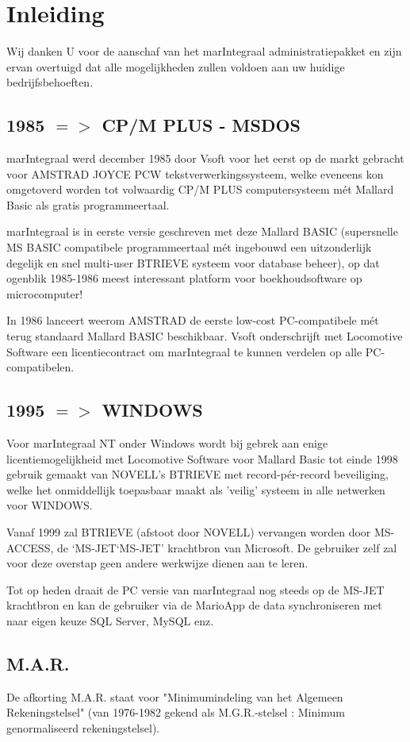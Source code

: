 \documentclass[12pt]{report} %
\begin{document}
\tableofcontents

\chapter{Inleiding}
Wij danken U voor de aanschaf van het marIntegraal administratiepakket en zijn ervan
overtuigd dat alle mogelijkheden zullen voldoen aan uw huidige bedrijfsbehoeften.

\section{1985 $=>$ CP/M PLUS - MSDOS}
marIntegraal werd december 1985 door Vsoft voor het eerst op de markt gebracht voor
AMSTRAD JOYCE PCW tekstverwerkingssysteem, welke eveneens kon omgetoverd worden tot
volwaardig CP/M PLUS computersysteem mét Mallard Basic als gratis programmeertaal.

marIntegraal is in eerste versie geschreven met deze Mallard BASIC (supersnelle
MS BASIC compatibele programmeertaal mét ingebouwd een uitzonderlijk degelijk en snel
multi-user BTRIEVE systeem voor database beheer), op dat ogenblik 1985-1986 meest
interessant platform voor boekhoudsoftware op microcomputer!

In 1986 lanceert weerom AMSTRAD de eerste low-cost PC-compatibele mét terug standaard
Mallard BASIC beschikbaar. Vsoft onderschrijft met Locomotive Software een
licentiecontract om marIntegraal te kunnen verdelen op alle PC-compatibelen.

\section{1995 $=>$ WINDOWS}
Voor marIntegraal NT onder Windows wordt bij gebrek aan enige licentiemogelijkheid
met Locomotive Software voor Mallard Basic tot einde 1998 gebruik gemaakt van
NOVELL's BTRIEVE met record-pér-record beveiliging, welke het onmiddellijk toepasbaar
maakt als 'veilig' systeem in alle netwerken voor WINDOWS.

Vanaf 1999 zal BTRIEVE (afstoot door NOVELL) vervangen worden door MS-ACCESS,
de ‘MS-JET‘MS-JET’ krachtbron van Microsoft. De gebruiker zelf zal voor deze overstap
geen andere werkwijze dienen aan te leren.

Tot op heden draait de PC versie van marIntegraal nog steeds op de MS-JET krachtbron
en kan de gebruiker via de MarioApp de data synchroniseren met naar eigen keuze
SQL Server, MySQL enz.

\section{M.A.R.}
De afkorting M.A.R. staat voor "Minimumindeling van het Algemeen Rekeningstelsel"
(van 1976-1982 gekend als M.G.R.-stelsel : Minimum genormaliseerd rekeningstelsel).
\end{document}

